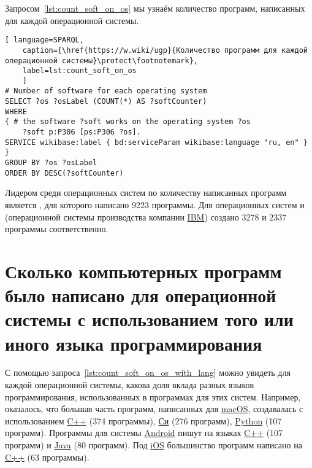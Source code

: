 Запросом~\ref{lst:count_soft_on_os} мы узнаём количество программ, 
написанных для каждой операционной системы.

\begin{lstlisting}[ language=SPARQL, 
	caption={\href{https://w.wiki/ugp}{Количество программ для каждой операционной системы}\protect\footnotemark},
	label=lst:count_soft_on_os
	]
# Number of software for each operating system
SELECT ?os ?osLabel (COUNT(*) AS ?softCounter)
WHERE
{ # the software ?soft works on the operating system ?os
	?soft p:P306 [ps:P306 ?os].
SERVICE wikibase:label { bd:serviceParam wikibase:language "ru, en" }
}
GROUP BY ?os ?osLabel
ORDER BY DESC(?softCounter)
\end{lstlisting}

Лидером среди операционных систем по количеству написанных программ является , для которого написано \num{9223} программы. Для операционных систем  и   (операционной системы производства компании \href{https://www.wikidata.org/wiki/Q37156}{IBM}) создано \num{3278} и \num{2337} программы соответственно.


\section{Сколько компьютерных программ было написано для операционной системы с использованием того или иного языка программирования}

С помощью запроса~\ref{lst:count_soft_on_os_with_lang} можно увидеть для каждой операционной системы, 
какова доля вклада разных языков программирования, использованных в программах для этих систем. 
Например, оказалось, что большая часть программ, 
написанных для \href{https://www.wikidata.org/wiki/Q14116}{macOS}, 
создавалась с использованием \href{https://www.wikidata.org/wiki/Q2407}{C++} (374 программы), 
\href{https://www.wikidata.org/wiki/Q15777}{Си} (276 программ), 
\href{https://www.wikidata.org/wiki/Q28865}{Python} (107 программ).
Программы для системы \href{https://www.wikidata.org/wiki/Q94}{Android} пишут 
на языках \href{https://www.wikidata.org/wiki/Q2407}{C++} (107 программ) 
и \href{https://www.wikidata.org/wiki/Q251}{Java} (80 программ).
Под \href{https://www.wikidata.org/wiki/Q48493}{iOS} большинство программ 
написано на \href{https://www.wikidata.org/wiki/Q2407}{C++} (63 программы).

